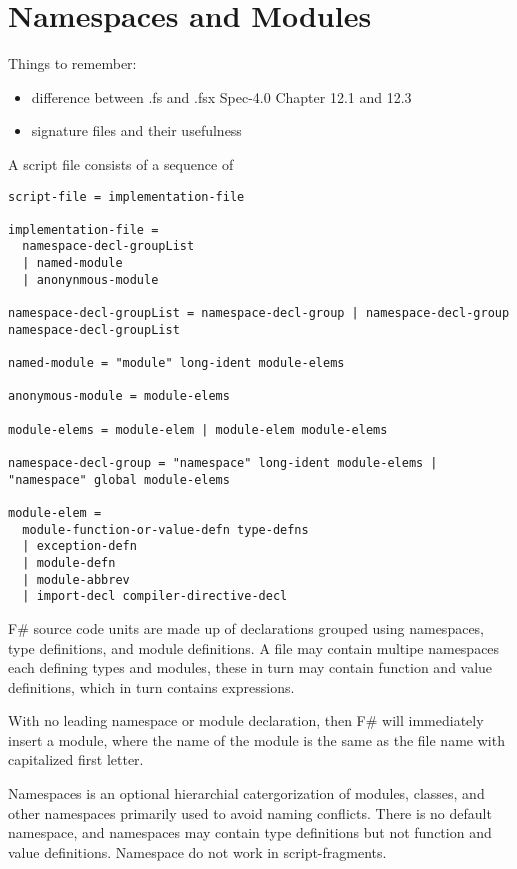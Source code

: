 \chapter{Namespaces and Modules}
\label{chap:modules}
Things to remember: 
\begin{itemize}
\item difference between .fs and .fsx Spec-4.0 Chapter 12.1 and 12.3
\item signature files and their usefulness
\end{itemize}


A script file consists of a sequence of 
\begin{lstlisting}[language=ebnf]
script-file = implementation-file

implementation-file =
  namespace-decl-groupList
  | named-module
  | anonynmous-module

namespace-decl-groupList = namespace-decl-group | namespace-decl-group namespace-decl-groupList
 
named-module = "module" long-ident module-elems

anonymous-module = module-elems

module-elems = module-elem | module-elem module-elems

namespace-decl-group = "namespace" long-ident module-elems | "namespace" global module-elems

module-elem = 
  module-function-or-value-defn type-defns
  | exception-defn
  | module-defn
  | module-abbrev
  | import-decl compiler-directive-decl
\end{lstlisting}

F\# source code units are made up of declarations grouped using namespaces, type definitions, and module definitions. A file may contain multipe namespaces each defining types and modules, these in turn may contain function and value definitions, which in turn contains expressions. 

With no leading namespace or module declaration, then F\# will immediately insert a module, where the name of the module is the same as the file name with capitalized first letter.

Namespaces is an optional hierarchial catergorization of modules, classes, and other namespaces primarily used to avoid naming conflicts. There is no default namespace, and namespaces may contain type definitions but not function and value definitions. Namespace do not work in script-fragments.

